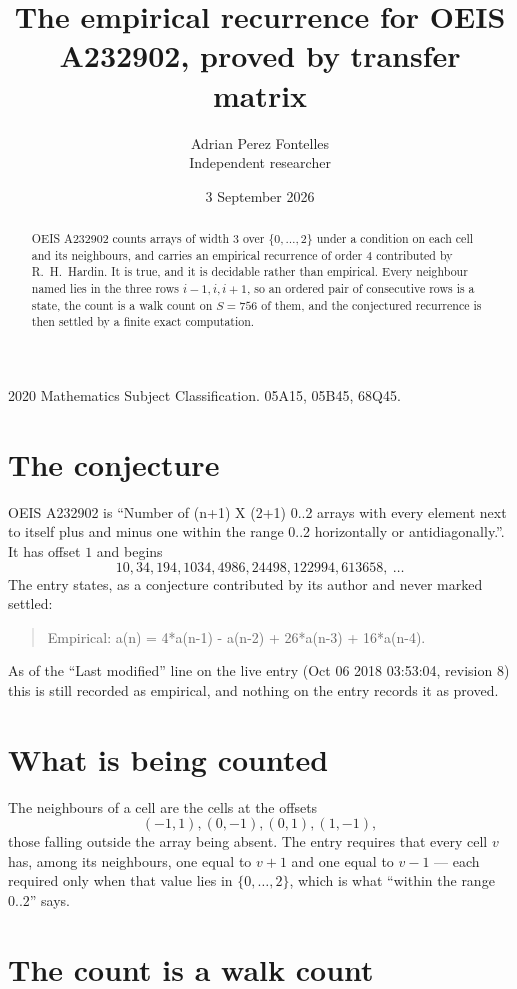 \documentclass[11pt,a4paper]{article}
\title{The empirical recurrence for OEIS A232902, proved by transfer matrix}
\author{Adrian Perez Fontelles\\ \small Independent researcher}
\date{3 September 2026}
\theoremstyle{plain}
\theoremstyle{definition}
\begin{document}
\maketitle

\begin{abstract}
OEIS A232902 counts arrays of width $3$ over $\{0,\dots,2\}$ under a condition on each cell
and its neighbours, and carries an empirical recurrence of order $4$ contributed by
R.~H.~Hardin. It is true, and it is decidable rather than empirical. Every neighbour named lies
in the three rows $i-1,i,i+1$, so an ordered pair of consecutive rows is a state, the count is
a walk count on $S=756$ of them, and the conjectured recurrence is then settled by a finite
exact computation.
\end{abstract}

\noindent\small 2020 Mathematics Subject Classification. 05A15, 05B45, 68Q45.\normalsize

\section{The conjecture}

OEIS A232902 is ``Number of (n+1) X (2+1) 0..2 arrays with every element next to itself plus and minus one within the range 0..2 horizontally or antidiagonally.''. It has offset $1$ and begins
\[
10, 34, 194, 1034, 4986, 24498, 122994, 613658,\ \dots
\]
The entry states, as a conjecture contributed by its author and never marked settled:
\begin{quote}
Empirical: a(n) = 4*a(n-1) - a(n-2) + 26*a(n-3) + 16*a(n-4).
\end{quote}
As of the ``Last modified'' line on the live entry (Oct 06 2018 03:53:04, revision 8) this is still
recorded as empirical, and nothing on the entry records it as proved.

\section{What is being counted}

The neighbours of a cell are the cells at the offsets
\[
(-1,1), (0,-1), (0,1), (1,-1),
\]
those falling outside the array being absent. The entry requires that every cell $v$ has, among its neighbours, one equal to $v+1$ and one equal to $v-1$ --- each required only when that value lies in $\{0,\dots,2\}$, which is what ``within the range $0..2$'' says.

\section{The count is a walk count}
\end{document}
